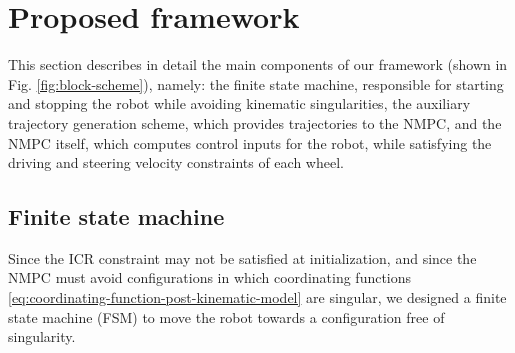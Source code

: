\section{Proposed framework}
\label{sec:proposed-framework}
This section describes in detail the main components of our framework
(shown in Fig. \ref{fig:block-scheme}), namely: the finite state machine,
responsible for starting and stopping the robot while avoiding kinematic
singularities, the auxiliary trajectory generation scheme, which provides
trajectories to the NMPC, and the NMPC itself, which computes control inputs
for the robot, while satisfying the driving and steering velocity constraints
of each wheel.

\subsection{Finite state machine}
\label{sec:finite-state-machine}
Since the ICR constraint may not be satisfied at initialization, and since the
NMPC must avoid configurations in which coordinating functions
\eqref{eq:coordinating-function-post-kinematic-model} are singular, we
designed a finite state machine (FSM) to move the robot towards a configuration
free of singularity.


